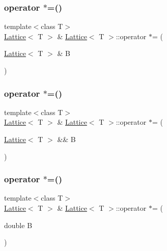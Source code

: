 \subsubsection{\texorpdfstring{operator $\ast$=()}{operator *=()}\hspace{0.1cm}{\footnotesize\ttfamily [1/4]}}
{\footnotesize\ttfamily template$<$class T$>$ \\
\mbox{\hyperlink{class_lattice}{Lattice}}$<$ T $>$ \& \mbox{\hyperlink{class_lattice}{Lattice}}$<$ T $>$\+::operator $\ast$= (\begin{DoxyParamCaption}\item[{\mbox{\hyperlink{class_lattice}{Lattice}}$<$ T $>$ \&}]{B }\end{DoxyParamCaption})\hspace{0.3cm}{\ttfamily [inline]}}

\mbox{\label{class_lattice_a610be724a235b1de20babde84dcd16dd}} 
\subsubsection{\texorpdfstring{operator $\ast$=()}{operator *=()}\hspace{0.1cm}{\footnotesize\ttfamily [2/4]}}
{\footnotesize\ttfamily template$<$class T$>$ \\
\mbox{\hyperlink{class_lattice}{Lattice}}$<$ T $>$ \& \mbox{\hyperlink{class_lattice}{Lattice}}$<$ T $>$\+::operator $\ast$= (\begin{DoxyParamCaption}\item[{\mbox{\hyperlink{class_lattice}{Lattice}}$<$ T $>$ \&\&}]{B }\end{DoxyParamCaption})\hspace{0.3cm}{\ttfamily [inline]}}

\mbox{\label{class_lattice_a1d7db986711ac8ff3a26e8d865d66a89}} 
\subsubsection{\texorpdfstring{operator $\ast$=()}{operator *=()}\hspace{0.1cm}{\footnotesize\ttfamily [3/4]}}
{\footnotesize\ttfamily template$<$class T$>$ \\
\mbox{\hyperlink{class_lattice}{Lattice}}$<$ T $>$ \& \mbox{\hyperlink{class_lattice}{Lattice}}$<$ T $>$\+::operator $\ast$= (\begin{DoxyParamCaption}\item[{double}]{B }\end{DoxyParamCaption})\hspace{0.3cm}{\ttfamily [inline]}}

